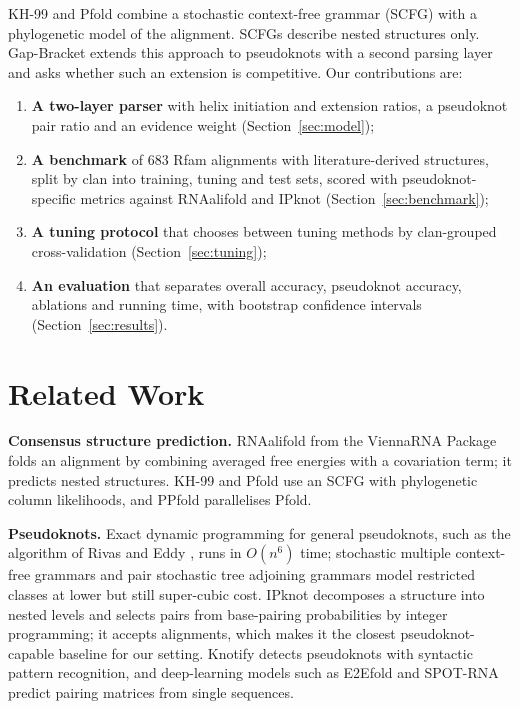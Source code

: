 \documentclass[10pt, twocolumn]{article}
\newcommand{\GB}{Gap-Bracket}
\begin{document}
KH-99 \cite{knudsen1999} and Pfold \cite{knudsen2003} combine a stochastic context-free grammar (SCFG) with a phylogenetic model of the alignment. SCFGs describe nested structures only. \GB{} extends this approach to pseudoknots with a second parsing layer and asks whether such an extension is competitive. Our contributions are:
\begin{enumerate}
    \item \textbf{A two-layer parser} with helix initiation and extension ratios, a pseudoknot pair ratio and an evidence weight (Section~\ref{sec:model});
    \item \textbf{A benchmark} of 683 Rfam alignments with literature-derived structures, split by clan into training, tuning and test sets, scored with pseudoknot-specific metrics against RNAalifold and IPknot (Section~\ref{sec:benchmark});
    \item \textbf{A tuning protocol} that chooses between tuning methods by clan-grouped cross-validation (Section~\ref{sec:tuning});
    \item \textbf{An evaluation} that separates overall accuracy, pseudoknot accuracy, ablations and running time, with bootstrap confidence intervals (Section~\ref{sec:results}).
\end{enumerate}

\section{Related Work}
\textbf{Consensus structure prediction.} RNAalifold \cite{bernhart2008rnaalifold} from the ViennaRNA Package \cite{lorenz2011viennarna} folds an alignment by combining averaged free energies with a covariation term; it predicts nested structures. KH-99 and Pfold use an SCFG with phylogenetic column likelihoods, and PPfold \cite{sukosd2012ppfold} parallelises Pfold.

\textbf{Pseudoknots.} Exact dynamic programming for general pseudoknots, such as the algorithm of Rivas and Eddy \cite{rivas1999pseudoknots}, runs in $O(n^6)$ time; stochastic multiple context-free grammars \cite{kato2006stochastic} and pair stochastic tree adjoining grammars \cite{matsui2005pair} model restricted classes at lower but still super-cubic cost. IPknot \cite{sato2011ipknot} decomposes a structure into nested levels and selects pairs from base-pairing probabilities by integer programming; it accepts alignments, which makes it the closest pseudoknot-capable baseline for our setting. Knotify \cite{andrikos2023knotify} detects pseudoknots with syntactic pattern recognition, and deep-learning models such as E2Efold \cite{chen2022rna} and SPOT-RNA \cite{singh2019rna} predict pairing matrices from single sequences.
\end{document}
